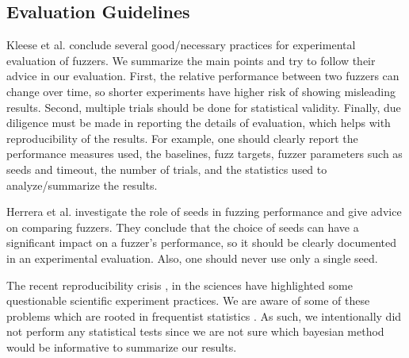 \subsection{Evaluation Guidelines}
Kleese et al. \cite{Klees.2018} conclude several good/necessary practices for experimental evaluation of fuzzers.
%
We summarize the main points and try to follow their advice in our evaluation.
%
First, the relative performance between two fuzzers can change over time, so shorter experiments have higher risk of showing misleading results.
%
Second, multiple trials should be done for statistical validity.
%
Finally, due diligence must be made in reporting the details of evaluation, which helps with reproducibility of the results.
%
For example, one should clearly report the performance measures used, the baselines, fuzz targets, fuzzer parameters such as seeds and timeout, the number of trials, and the statistics used to analyze/summarize the results.


Herrera et al. \cite{Herrera.2021} investigate the role of seeds in fuzzing performance and give advice on comparing fuzzers.
%
They conclude that the choice of seeds can have a significant impact on a fuzzer's performance, so it should be clearly documented in an experimental evaluation.
%
Also, one should never use only a single seed.


The recent reproducibility crisis \cite{Baker.2016}, \cite{Oza.2023} in the sciences have highlighted some questionable scientific experiment practices.
%
We are aware of some of these problems which are rooted in frequentist statistics \cite{Jaynes.2003,Clayton.2021}.
%
As such, we intentionally did not perform any statistical tests since we are not sure which bayesian method would be informative to summarize our results.